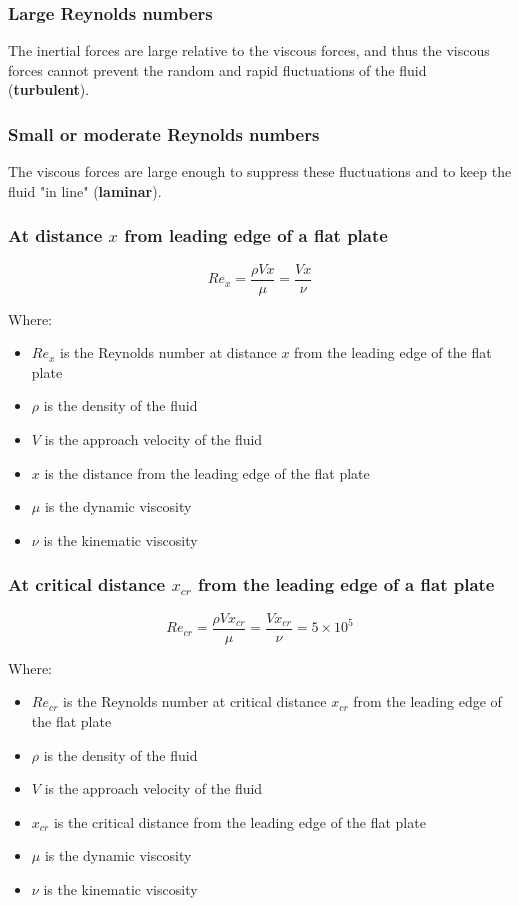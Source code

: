 \documentclass[11pt]{article}
\begin{document}
\subsubsection{Large Reynolds numbers}
\label{sec:org6126d6c}
The inertial forces are large relative to the viscous forces, and thus the viscous forces cannot prevent the random and rapid fluctuations of the fluid (\textbf{turbulent}).

\subsubsection{Small or moderate Reynolds numbers}
\label{sec:org6c7fb6a}
The viscous forces are large enough to suppress these fluctuations and to keep the fluid "in line" (\textbf{laminar}).

\subsubsection{At distance \(x\) from leading edge of a flat plate}
\label{sec:org32ee814}
\[Re_x = \frac{\rho V x}{\mu} = \frac{Vx}{\nu}\]

Where:
\begin{itemize}
\item \(Re_{x}\) is the Reynolds number at distance \(x\) from the leading edge of the flat plate
\item \(\rho\) is the density of the fluid
\item \(V\) is the approach velocity of the fluid
\item \(x\) is the distance from the leading edge of the flat plate
\item \(\mu\) is the dynamic viscosity
\item \(\nu\) is the kinematic viscosity
\end{itemize}

\subsubsection{At critical distance \(x_{cr}\) from the leading edge of a flat plate}
\label{sec:org613526d}
\[Re_{cr} = \frac{\rho V x_{cr}}{\mu} = \frac{V x_{cr}}{\nu} = 5 \times 10^5\]

Where:
\begin{itemize}
\item \(Re_{cr}\) is the Reynolds number at critical distance \(x_{cr}\) from the leading edge of the flat plate
\item \(\rho\) is the density of the fluid
\item \(V\) is the approach velocity of the fluid
\item \(x_{cr}\) is the critical distance from the leading edge of the flat plate
\item \(\mu\) is the dynamic viscosity
\item \(\nu\) is the kinematic viscosity
\end{itemize}
\end{document}
